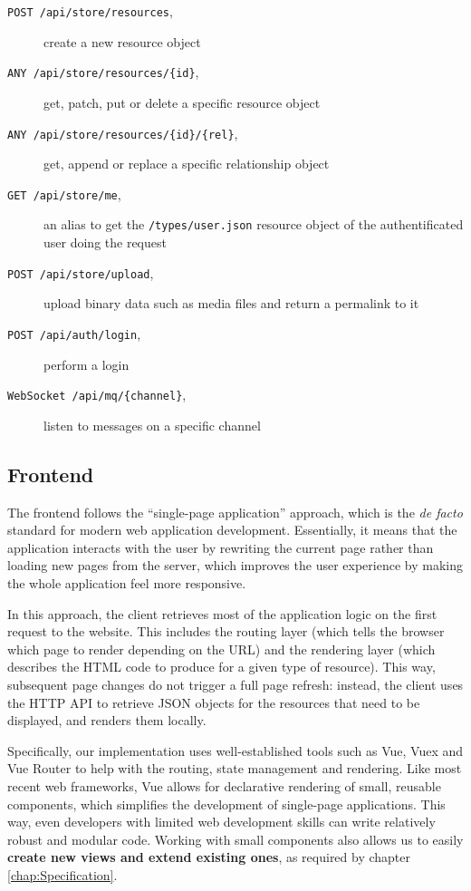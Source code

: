 \documentclass[a4paper, english]{report}
\begin{document}
\begin{description}
  \item[\texttt{POST /api/store/resources},] create a new resource object
  \item[\texttt{ANY /api/store/resources/\{id\}},] get, patch, put or delete a specific resource object
  \item[\texttt{ANY /api/store/resources/\{id\}/\{rel\}},] get, append or replace a specific relationship object
  \item[\texttt{GET /api/store/me},] an alias to get the \texttt{/types/user.json} resource object of the authentificated user doing the request
  \item[\texttt{POST /api/store/upload},] upload binary data such as media files and return a permalink to it
  \item[\texttt{POST /api/auth/login},] perform a login
  \item[\texttt{WebSocket /api/mq/\{channel\}},] listen to messages on a specific channel
\end{description}

\subsection{Frontend}

The frontend follows the ``single-page application'' approach, which is the \emph{de facto} standard for modern web application development. Essentially, it means that the application interacts with the user by rewriting the current page rather than loading new pages from the server, which improves the user experience by making the whole application feel more responsive. 

In this approach, the client retrieves most of the application logic on the first request to the website. This includes the routing layer (which tells the browser which page to render depending on the URL) and the rendering layer (which describes the HTML code to produce for a given type of resource). This way, subsequent page changes do not trigger a full page refresh: instead, the client uses the HTTP API to retrieve JSON objects for the resources that need to be displayed, and renders them locally.

Specifically, our implementation uses well-established tools such as Vue\cite{vuejs}, Vuex\cite{vuex} and Vue Router\cite{vuerouter} to help with the routing, state management and rendering. Like most recent web frameworks, Vue allows for declarative rendering of small, reusable components, which simplifies the development of single-page applications. This way, even developers with limited web development skills can write relatively robust and modular code. Working with small components also allows us to easily \textbf{create new views and extend existing ones}, as required by chapter \ref{chap:Specification}.
\end{document}
